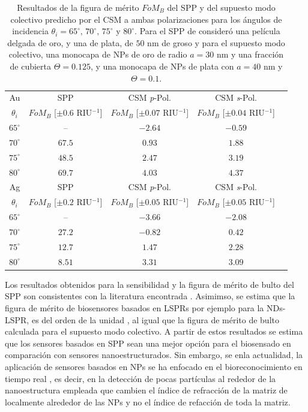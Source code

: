 \begin{table}[h!]
\centering
\caption{Resultados de la figura de mérito $\textit{FoM}_B$ del SPP y del supuesto modo colectivo predicho por el CSM a ambas polarizaciones para los ángulos de incidencia $\theta_i = 65^\circ,\,70^\circ,\, 75^\circ$ y $80^\circ$. Para el SPP de consideró una película delgada de oro, y una de plata, de $50$ nm de groso y para el supuesto modo colectivo, una monocapa de NPs de oro de radio $a=30$ nm y una fracción de cubierta $\Theta=0.125$, y una monocapa de NPs de plata con $a=40$ nm y $\Theta=0.1$.}\vspace*{-.7em}
\label{tab:FOM}\small
\begin{tabular}{c||c||ccc}
Au & SPP  & CSM \emph{p}-Pol. 	& CSM \emph{s}-Pol. \\ 
$\theta_i$ &  $\textit{FoM}_B$ [$\pm 0.6$ RIU$^{-1}$]	  &  $\textit{FoM}_B$ [$\pm 0.07$ RIU$^{-1}$]		&  $\textit{FoM}_B$  [$\pm 0.04$ RIU$^{-1}$]\\ \hline
$65^\circ$ & --			  &	$-2.64$ & $-0.59$\\
$70^\circ$ & $67.5$ &	$0.93$ & $1.88$\\
$75^\circ$ & $48.5$ &	$2.47$ & $3.19$\\
$80^\circ$ & $69.7$ &	$4.03$ & $4.37$\\
\hline \hline
Ag & SPP  & CSM \emph{p}-Pol. 	& CSM \emph{s}-Pol. \\ 
$\theta_i$ &  $\textit{FoM}_B$ [$\pm 0.2$ RIU$^{-1}$]	  &  $\textit{FoM}_B$ [$\pm 0.05$ RIU$^{-1}$]		&  $\textit{FoM}_B$  [$\pm 0.05$ RIU$^{-1}$]\\ \hline
$65^\circ$ & -- 			  &	$-3.66$ & $-2.08$\\
$70^\circ$ & $27.2$ &	$-0.82$ & $0.42$\\
$75^\circ$ & $12.7$ &	$1.47$  & $2.28$\\
$80^\circ$ & $8.51$ &	$3.31$  & $3.09$
\end{tabular}
\end{table}


Los resultados obtenidos para la sensibilidad y la figura de mérito de bulto del SPP son consistentes con la literatura encontrada \cite{estevez2014trends,danilov2018ultra,svedendahl2009refractometric}. Asimimso, se estima que la figura de mérito de biosensores basados en LSPRs por ejemplo para la NDs-LSPR, es del orden de la unidad \cite{svedendahl2009refractometric}, al igual que la figura de mérito de bulto calculada para el supuesto modo colectivo. A partir de estos resultados se estima que los sensores basados en SPP sean una mejor opción para el biosensado en comparación con sensores nanoestructurados. Sin embargo, se enla actualidad, la aplicación de sensores basados en NPs  se ha enfocado en el bioreconocimiento en tiempo real \cite{estevez2014trends,svedendahl2009refractometric}, es decir, en la detección de pocas partículas al rededor de la nanoestructura empleada que cambien el índice de refracción de la matriz de localmente alrededor de las NPs y no el índice de refacción de toda la matriz. 

